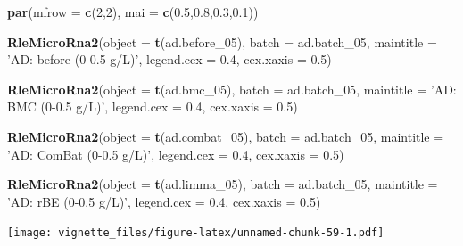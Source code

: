 \documentclass[]{book}
\newenvironment{Shaded}{\begin{snugshade}}{\end{snugshade}}
\newcommand{\KeywordTok}[1]{\textcolor[rgb]{0.13,0.29,0.53}{\textbf{#1}}}
\newcommand{\DataTypeTok}[1]{\textcolor[rgb]{0.13,0.29,0.53}{#1}}
\newcommand{\DecValTok}[1]{\textcolor[rgb]{0.00,0.00,0.81}{#1}}
\newcommand{\FloatTok}[1]{\textcolor[rgb]{0.00,0.00,0.81}{#1}}
\newcommand{\StringTok}[1]{\textcolor[rgb]{0.31,0.60,0.02}{#1}}
\newcommand{\NormalTok}[1]{#1}
\begin{document}
\begin{Shaded}
\begin{Highlighting}[]
\KeywordTok{par}\NormalTok{(}\DataTypeTok{mfrow =} \KeywordTok{c}\NormalTok{(}\DecValTok{2}\NormalTok{,}\DecValTok{2}\NormalTok{), }\DataTypeTok{mai =} \KeywordTok{c}\NormalTok{(}\FloatTok{0.5}\NormalTok{,}\FloatTok{0.8}\NormalTok{,}\FloatTok{0.3}\NormalTok{,}\FloatTok{0.1}\NormalTok{))}

\KeywordTok{RleMicroRna2}\NormalTok{(}\DataTypeTok{object =} \KeywordTok{t}\NormalTok{(ad.before_}\DecValTok{05}\NormalTok{), }\DataTypeTok{batch =}\NormalTok{ ad.batch_}\DecValTok{05}\NormalTok{, }
             \DataTypeTok{maintitle =} \StringTok{'AD: before (0-0.5 g/L)'}\NormalTok{, }\DataTypeTok{legend.cex =} \FloatTok{0.4}\NormalTok{, }
             \DataTypeTok{cex.xaxis =} \FloatTok{0.5}\NormalTok{)}

\KeywordTok{RleMicroRna2}\NormalTok{(}\DataTypeTok{object =} \KeywordTok{t}\NormalTok{(ad.bmc_}\DecValTok{05}\NormalTok{), }\DataTypeTok{batch =}\NormalTok{ ad.batch_}\DecValTok{05}\NormalTok{, }
             \DataTypeTok{maintitle =} \StringTok{'AD: BMC (0-0.5 g/L)'}\NormalTok{, }\DataTypeTok{legend.cex =} \FloatTok{0.4}\NormalTok{, }
             \DataTypeTok{cex.xaxis =} \FloatTok{0.5}\NormalTok{)}

\KeywordTok{RleMicroRna2}\NormalTok{(}\DataTypeTok{object =} \KeywordTok{t}\NormalTok{(ad.combat_}\DecValTok{05}\NormalTok{), }\DataTypeTok{batch =}\NormalTok{ ad.batch_}\DecValTok{05}\NormalTok{, }
             \DataTypeTok{maintitle =} \StringTok{'AD: ComBat (0-0.5 g/L)'}\NormalTok{, }\DataTypeTok{legend.cex =} \FloatTok{0.4}\NormalTok{, }
             \DataTypeTok{cex.xaxis =} \FloatTok{0.5}\NormalTok{)}

\KeywordTok{RleMicroRna2}\NormalTok{(}\DataTypeTok{object =} \KeywordTok{t}\NormalTok{(ad.limma_}\DecValTok{05}\NormalTok{), }\DataTypeTok{batch =}\NormalTok{ ad.batch_}\DecValTok{05}\NormalTok{, }
             \DataTypeTok{maintitle =} \StringTok{'AD: rBE (0-0.5 g/L)'}\NormalTok{, }\DataTypeTok{legend.cex =} \FloatTok{0.4}\NormalTok{, }
             \DataTypeTok{cex.xaxis =} \FloatTok{0.5}\NormalTok{)}
\end{Highlighting}
\end{Shaded}

\texttt{[image: vignette\_files/figure-latex/unnamed-chunk-59-1.pdf]}
\end{document}
